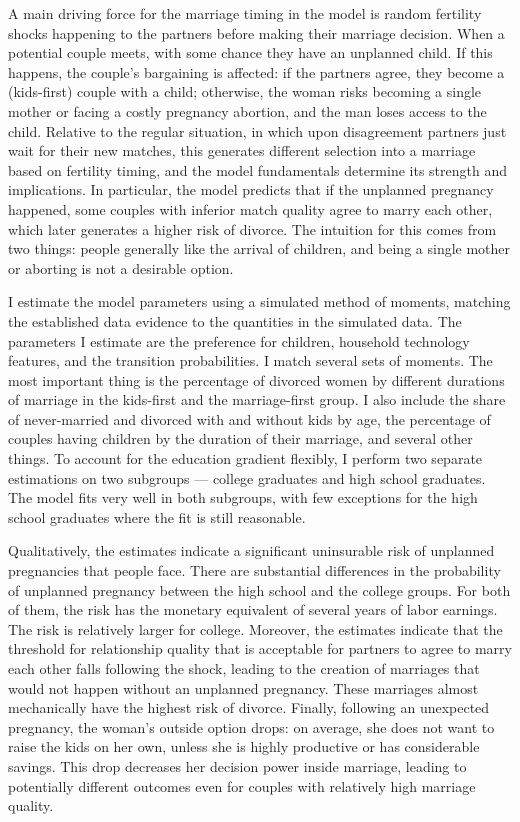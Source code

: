 \documentclass[12pt,letter]{article}
\begin{document}
A main driving force for the marriage timing in the model is random fertility shocks happening to the partners before making their marriage decision. When a potential couple meets, with some chance they have an unplanned child. If this happens, the couple's bargaining is affected: if the partners agree, they become a (kids-first) couple with a child; otherwise, the woman risks becoming a single mother or facing a costly pregnancy abortion, and the man loses access to the child. Relative to the regular situation, in which upon disagreement partners just wait for their new matches, this generates different selection into a marriage based on fertility timing, and the model fundamentals determine its strength and implications. In particular, the model predicts that if the unplanned pregnancy happened, some couples with inferior match quality agree to marry each other, which later generates a higher risk of divorce. The intuition for this comes from two things: people generally like the arrival of children, and being a single mother or aborting is not a desirable option.

I estimate the model parameters using a simulated method of moments, matching the established data evidence to the quantities in the simulated data. The parameters I estimate are the preference for children, household technology features, and the transition probabilities. I match several sets of moments. The most important thing is the percentage of divorced women by different durations of marriage in the kids-first and the marriage-first group. I also include the share of never-married and divorced with and without kids by age, the percentage of couples having children by the duration of their marriage, and several other things. To account for the education gradient flexibly, I perform two separate estimations on two subgroups --- college graduates and high school graduates. The model fits very well in both subgroups, with few exceptions for the high school graduates where the fit is still reasonable.

Qualitatively, the estimates indicate a significant uninsurable risk of unplanned pregnancies that people face. There are substantial differences in the probability of unplanned pregnancy between the high school and the college groups. For both of them, the risk has the monetary equivalent of several years of labor earnings. The risk is relatively larger for college. Moreover, the estimates indicate that the threshold for relationship quality that is acceptable for partners to agree to marry each other falls following the shock, leading to the creation of marriages that would not happen without an unplanned pregnancy. These marriages almost mechanically have the highest risk of divorce. Finally, following an unexpected pregnancy, the woman's outside option drops: on average, she does not want to raise the kids on her own, unless she is highly productive or has considerable savings. This drop decreases her decision power inside marriage, leading to potentially different outcomes even for couples with relatively high marriage quality.
\end{document}
